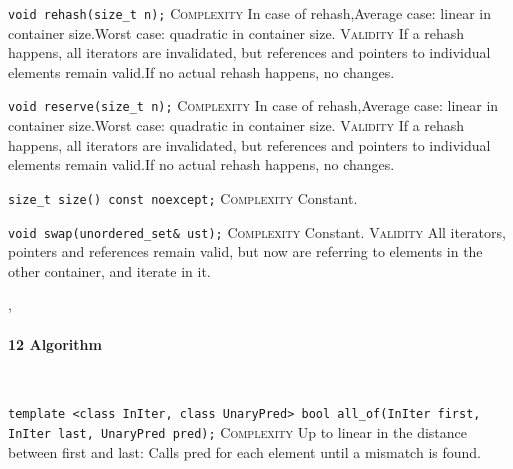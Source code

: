 \noindent{}\hspace*{0.25em}\lstinline[basicstyle=\ttfamily\color{corange}]{void rehash(size_t n);} \textsc{Complexity} In case of rehash,Average case: linear in container size.Worst case: quadratic in container size. \textsc{Validity} If a rehash happens, all iterators are invalidated, but references and pointers to individual elements remain valid.If no actual rehash happens, no changes.\\\vspace{-0.6em}

\noindent{}\hspace*{0.25em}\lstinline[basicstyle=\ttfamily\color{corange}]{void reserve(size_t n);} \textsc{Complexity} In case of rehash,Average case: linear in container size.Worst case: quadratic in container size. \textsc{Validity} If a rehash happens, all iterators are invalidated, but references and pointers to individual elements remain valid.If no actual rehash happens, no changes.\\\vspace{-0.6em}

\noindent{}\hspace*{0.25em}\lstinline[basicstyle=\ttfamily\color{cgreen}]{size_t size() const noexcept;} \textsc{Complexity} Constant.\\\vspace{-0.6em}

\noindent{}\hspace*{0.25em}\lstinline[basicstyle=\ttfamily\color{cgreen}]{void swap(unordered_set& ust);} \textsc{Complexity} Constant. \textsc{Validity} All iterators, pointers and references remain valid, but now are referring to elements in the other container, and iterate in it.\\\vspace{-0.6em}


\sep
{}
\paragraph{12 Algorithm}\mbox{}\vspace{0.5em}\\
\noindent{}\hspace*{0.25em}\lstinline[basicstyle=\ttfamily\color{corange}]{template <class InIter, class UnaryPred> bool all_of(InIter first, InIter last, UnaryPred pred);} \textsc{Complexity} Up to linear in the distance between first and last: Calls pred for each element until a mismatch is found.\\\vspace{-0.6em}

